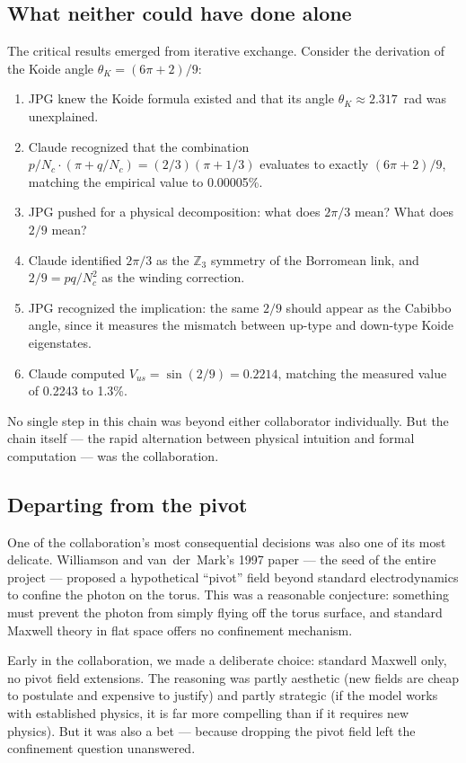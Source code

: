 \documentclass[11pt,a4paper]{article}
\begin{document}
\subsection{What neither could have done alone}

The critical results emerged from iterative exchange. Consider the derivation of the Koide angle $\theta_K = (6\pi + 2)/9$:

\begin{enumerate}
  \item JPG knew the Koide formula existed and that its angle $\theta_K \approx 2.317$~rad was unexplained.
  \item Claude recognized that the combination $p/N_c \cdot (\pi + q/N_c) = (2/3)(\pi + 1/3)$ evaluates to exactly $(6\pi + 2)/9$, matching the empirical value to 0.00005\%.
  \item JPG pushed for a physical decomposition: what does $2\pi/3$ mean? What does $2/9$ mean?
  \item Claude identified $2\pi/3$ as the $\mathbb{Z}_3$ symmetry of the Borromean link, and $2/9 = pq/N_c^2$ as the winding correction.
  \item JPG recognized the implication: the same $2/9$ should appear as the Cabibbo angle, since it measures the mismatch between up-type and down-type Koide eigenstates.
  \item Claude computed $V_{us} = \sin(2/9) = 0.2214$, matching the measured value of 0.2243 to 1.3\%.
\end{enumerate}

No single step in this chain was beyond either collaborator individually. But the chain itself --- the rapid alternation between physical intuition and formal computation --- was the collaboration.

\subsection{Departing from the pivot}

One of the collaboration's most consequential decisions was also one of its most delicate. Williamson and van~der~Mark's 1997 paper --- the seed of the entire project --- proposed a hypothetical ``pivot'' field beyond standard electrodynamics to confine the photon on the torus. This was a reasonable conjecture: something must prevent the photon from simply flying off the torus surface, and standard Maxwell theory in flat space offers no confinement mechanism.

Early in the collaboration, we made a deliberate choice: standard Maxwell only, no pivot field extensions. The reasoning was partly aesthetic (new fields are cheap to postulate and expensive to justify) and partly strategic (if the model works with established physics, it is far more compelling than if it requires new physics). But it was also a bet --- because dropping the pivot field left the confinement question unanswered.
\end{document}
